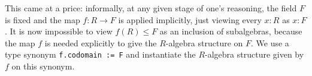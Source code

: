 \documentclass[a4paper,USenglish,cleveref, autoref, thm-restate]{lipics-v2021}
\newcommand{\lean}[1]{\texttt{#1}\xspace} %
\newcommand{\Q}{\mathbb{Q}}
\newcommand{\Z}{\mathbb{Z}}
\DeclareMathOperator{\Frac}{Frac}
\begin{document}

This came at a price: %
informally, at any given stage of one's reasoning, the field $F$ is fixed and the map $f\colon R\to F$ is applied implicitly, just viewing every $x:R$ as $x:F$.
It is now impossible to view $f(R) \leq F$ as an inclusion of subalgebras,
because the map $f$ is needed explicitly to give the $R$-algebra structure on $F$.
We use a type synonym \lean{f.codomain := F} and instantiate the $R$-algebra structure given by $f$ on this synonym.

\end{document}
